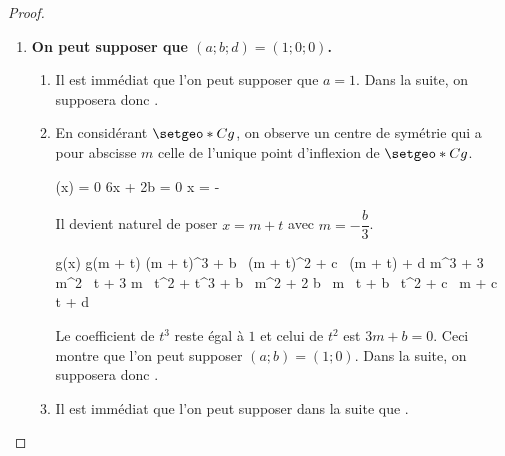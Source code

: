 \begin{proof}
	\leavevmode
	\begin{enumerate}
		\item \textbf{On peut supposer que $(a ; b ; d) = (1 ; 0 ; 0)$.}

		      \begin{enumerate}
		      		\item Il est immédiat que l'on peut supposer que $a = 1$. 
				          Dans la suite, on supposera donc .

		      		\item En considérant $\setgeo*{C}{g}$, on observe un centre de symétrie qui a pour abscisse $m$ celle de l'unique point d'inflexion de $\setgeo*{C}{g}$.
					      
					      \smallskip
					      
					      \noindent
					      \begin{explain}[style = sar, ope = \iff]
					      		(x) = 0
									\explnext{}
								6x + 2b = 0
									\explnext{}
								x = - 
					      \end{explain}
					      
					      \smallskip
					      
					      \noindent
					      Il devient naturel de poser $x = m + t$ avec $m = - \dfrac{b}{3}$.
					      
					      \smallskip
					      
					      \noindent
					      \begin{explain}[style = sar]
					      		g(x)
									\explnext{}
								g(m + t)
									\explnext{}
								(m + t)^3 + b \, (m + t)^2 + c \, (m + t) + d
									\explnext{}
								m^3 + 3 m^2 \, t + 3 m \, t^2 + t^3
									+ b \, m^2 + 2 b \, m \, t + b \, t^2 
									+ c \, m + c \, t + d
					      \end{explain} 
					      
					      \smallskip
					      
					      \noindent
					      Le coefficient de $t^3$ reste égal à $1$ et celui de $t^2$ est $3m + b = 0$. Ceci montre que l'on peut supposer $(a ; b) = (1 ; 0)$.
				          Dans la suite, on supposera donc .

		      		\item Il est immédiat que l'on peut supposer dans la suite que .
		      \end{enumerate}



\end{enumerate}
\end{proof}
